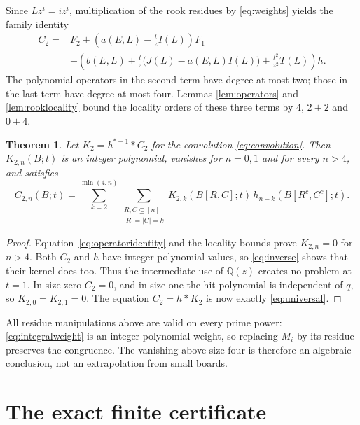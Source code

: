 \documentclass[11pt]{article}
\newtheorem{theorem}{Theorem}
\newcommand{\QQ}{\mathbb Q}
\newcommand{\invh}{h^{*-1}}
\begin{document}
Since $Lz^i=iz^i$, multiplication of the rook residues by
\eqref{eq:weights} yields the family identity
\begin{equation}\label{eq:operatoridentity}
\begin{split}
 C_2={}&F_2+\left(a(E,L)-\frac{t}{z}I(L)\right)F_1\\
 &+\left(b(E,L)+\frac{t}{z}\bigl(J(L)-a(E,L)I(L)\bigr)
                    +\frac{t^2}{z^2}T(L)\right)h.
\end{split}
\end{equation}
The polynomial operators in the second term have degree at most two;
those in the last term have degree at most four. Lemmas
\ref{lem:operators} and \ref{lem:rooklocality} bound the locality orders
of these three terms by $4$, $2+2$ and $0+4$.

\begin{theorem}\label{thm:locality}
Let $K_2=\invh*C_2$ for the convolution \eqref{eq:convolution}.
Then $K_{2,n}(B;t)$ is an integer polynomial, vanishes for $n=0,1$ and
for every $n>4$, and satisfies
\begin{equation}\label{eq:universal}
 C_{2,n}(B;t)=\sum_{k=2}^{\min(4,n)}
  \sum_{\substack{R,C\subseteq[n]\\|R|=|C|=k}}
  K_{2,k}(B[R,C];t)\,h_{n-k}(B[R^c,C^c];t).
\end{equation}
\end{theorem}
\begin{proof}
Equation~\eqref{eq:operatoridentity} and the locality bounds prove
$K_{2,n}=0$ for $n>4$. Both $C_2$ and $h$ have integer-polynomial
values, so \eqref{eq:inverse} shows that their kernel does too.
Thus the intermediate use of $\QQ(z)$ creates no problem at $t=1$.
In size zero $C_2=0$, and in size one the hit polynomial is independent
of $q$, so $K_{2,0}=K_{2,1}=0$. The equation $C_2=h*K_2$ is now
exactly \eqref{eq:universal}.
\end{proof}

All residue manipulations above are valid on every prime power:
\eqref{eq:integralweight} is an integer-polynomial weight, so replacing
$M_i$ by its residue preserves the congruence. The vanishing above size
four is therefore an algebraic conclusion, not an extrapolation from
small boards.

\section{The exact finite certificate}
\end{document}
